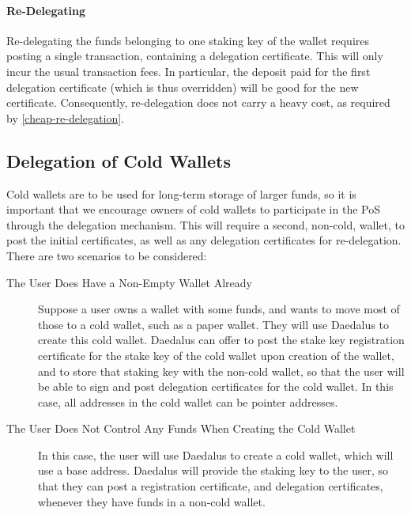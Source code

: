 \documentclass[11pt,a4paper]{article}
\begin{document}
\paragraph{Re-Delegating}
Re-delegating the funds belonging to one staking key of the wallet
requires posting a single transaction, containing a delegation
certificate. This will only incur the usual transaction fees. In
particular, the deposit paid for the first delegation certificate
(which is thus overridden) will be good for the new
certificate. Consequently, re-delegation does not carry a heavy cost,
as required by \cref{cheap-re-delegation}.

\subsection{Delegation of Cold Wallets}
\label{delegation-of-cold-wallets}

Cold wallets are to be used for long-term storage of larger funds, so
it is important that we encourage owners of cold wallets to
participate in the PoS through the delegation mechanism. This will
require a second, non-cold, wallet, to post the initial certificates,
as well as any delegation certificates for re-delegation. There are
two scenarios to be considered:

\begin{description}
\item[The User Does Have a Non-Empty Wallet Already] Suppose a user
  owns a wallet with some funds, and wants to move most of those to a
  cold wallet, such as a paper wallet. They will use Daedalus to
  create this cold wallet. Daedalus can offer to post the stake key
  registration certificate for the stake key of the cold wallet upon
  creation of the wallet, and to store that staking key with the
  non-cold wallet, so that the user will be able to sign and post
  delegation certificates for the cold wallet. In this case, all
  addresses in the cold wallet can be pointer addresses.
\item[The User Does Not Control Any Funds When Creating the Cold
  Wallet] In this case, the user will use Daedalus to create a cold
  wallet, which will use a base address. Daedalus will provide the
  staking key to the user, so that they can post a registration
  certificate, and delegation certificates, whenever they have funds
  in a non-cold wallet.
\end{description}
\end{document}
